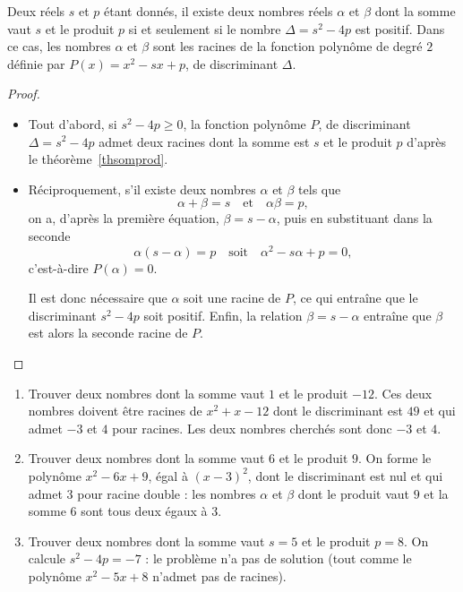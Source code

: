 \begin{thm}
Deux réels $s$ et $p$ étant donnés, il existe deux nombres réels $\alpha$ et $\beta$ dont la somme vaut $s$ et le produit $p$ si et seulement si le nombre $\Delta=s^2-4p$ est positif. Dans ce cas, les  nombres $\alpha$ et $\beta$ sont les racines de la fonction polynôme de degré $2$ définie par  $P(x)=x^2-sx+p$, de discriminant $\Delta$.
\end{thm}
\begin{proof}
\begin{itemize}
\item Tout d'abord, si $s^2-4p≥0$, la fonction  polynôme $P$, de discriminant $\Delta=s^2-4p$ admet deux racines dont la somme est $s$ et le produit $p$ d'après le théorème \ref{thsomprod}.

\item Réciproquement, s'il existe deux nombres $\alpha$ et $\beta$ tels que 
\[ 
\alpha+\beta=s \quad\text{et}\quad \alpha\beta=p,
\]
on a, d'après la première équation, $\beta=s-\alpha$, puis en substituant dans la seconde 
\[\alpha(s-\alpha)=p\quad\text{soit}\quad\alpha^2-s\alpha+p=0,\]
c'est-à-dire $P(\alpha)=0$.

Il est donc nécessaire que $\alpha$ soit une racine de $P$, ce qui entraîne que le discriminant $s^2-4p$ soit positif. Enfin, la relation $\beta=s-\alpha$ entraîne que $\beta$ est alors la seconde racine de $P$.\qedhere
\end{itemize}
\end{proof}
\begin{example}[Exemples]
\begin{enumerate}
\item Trouver deux nombres dont la somme vaut $1$ et le produit $-12$. Ces deux nombres doivent être racines de $x^2+x-12$ dont le discriminant est $49$ et qui admet $-3$ et $4$ pour racines. Les deux nombres cherchés sont donc $-3$ et $4$.
\item Trouver deux nombres dont la somme vaut $6$ et le produit $9$. On forme le polynôme $x^2-6x+9$, égal à $(x-3)^2$, dont le discriminant est nul et qui admet $3$ pour racine double : les nombres $\alpha$ et $\beta$ dont le produit vaut $9$ et la somme $6$ sont tous deux égaux à $3$.
\item Trouver deux nombres dont la somme vaut $s=5$ et le produit $p=8$. On calcule $s^2-4p=-7$ : le problème n'a pas de solution (tout comme le polynôme $x^2-5x+8$ n'admet pas de racines). 
\end{enumerate}
\end{example}
\endinput

